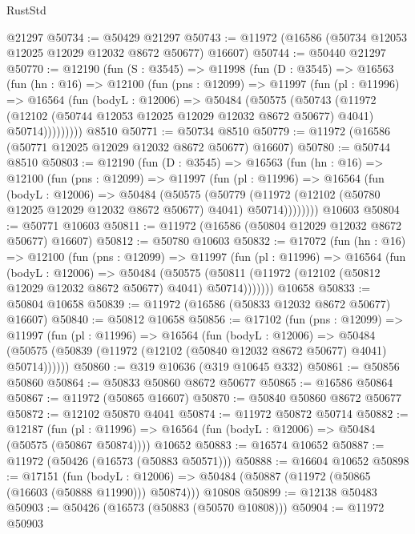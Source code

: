 \begin{lexlean}{RustStd}
\begin{coremodule}
    @21297
@50734 := @50429 @21297
@50743 := @11972 (@16586 (@50734 @12053 @12025 @12029 @12032 @8672 @50677) @16607)
@50744 := @50440 @21297
@50770 := @12190
    (fun (S : @3545) =>
    @11998
      (fun (D : @3545) =>
      @16563
        (fun (hn : @16) =>
        @12100
          (fun (pns : @12099) =>
          @11997
            (fun (pl : @11996) =>
            @16564
              (fun (bodyL : @12006) =>
              @50484
                (@50575
                  (@50743
                    (@11972
                      (@12102 (@50744 @12053 @12025 @12029 @12032 @8672 @50677) @4041)
                      @50714)))))))))
    @8510
@50771 := @50734 @8510
@50779 := @11972 (@16586 (@50771 @12025 @12029 @12032 @8672 @50677) @16607)
@50780 := @50744 @8510
@50803 := @12190
    (fun (D : @3545) =>
    @16563
      (fun (hn : @16) =>
      @12100
        (fun (pns : @12099) =>
        @11997
          (fun (pl : @11996) =>
          @16564
            (fun (bodyL : @12006) =>
            @50484
              (@50575
                (@50779
                  (@11972 (@12102 (@50780 @12025 @12029 @12032 @8672 @50677) @4041) @50714))))))))
    @10603
@50804 := @50771 @10603
@50811 := @11972 (@16586 (@50804 @12029 @12032 @8672 @50677) @16607)
@50812 := @50780 @10603
@50832 := @17072
    (fun (hn : @16) =>
    @12100
      (fun (pns : @12099) =>
      @11997
        (fun (pl : @11996) =>
        @16564
          (fun (bodyL : @12006) =>
          @50484
            (@50575 (@50811 (@11972 (@12102 (@50812 @12029 @12032 @8672 @50677) @4041) @50714)))))))
    @10658
@50833 := @50804 @10658
@50839 := @11972 (@16586 (@50833 @12032 @8672 @50677) @16607)
@50840 := @50812 @10658
@50856 := @17102
    (fun (pns : @12099) =>
    @11997
      (fun (pl : @11996) =>
      @16564
        (fun (bodyL : @12006) =>
        @50484 (@50575 (@50839 (@11972 (@12102 (@50840 @12032 @8672 @50677) @4041) @50714))))))
@50860 := @319 @10636 (@319 @10645 @332)
@50861 := @50856 @50860
@50864 := @50833 @50860 @8672 @50677
@50865 := @16586 @50864
@50867 := @11972 (@50865 @16607)
@50870 := @50840 @50860 @8672 @50677
@50872 := @12102 @50870 @4041
@50874 := @11972 @50872 @50714
@50882 := @12187
    (fun (pl : @11996) => @16564 (fun (bodyL : @12006) => @50484 (@50575 (@50867 @50874))))
    @10652
@50883 := @16574 @10652
@50887 := @11972 (@50426 (@16573 (@50883 @50571)))
@50888 := @16604 @10652
@50898 := @17151
    (fun (bodyL : @12006) => @50484 (@50887 (@11972 (@50865 (@16603 (@50888 @11990))) @50874)))
    @10808
@50899 := @12138 @50483
@50903 := @50426 (@16573 (@50883 (@50570 @10808)))
@50904 := @11972 @50903

\end{coremodule}
\end{lexlean}

